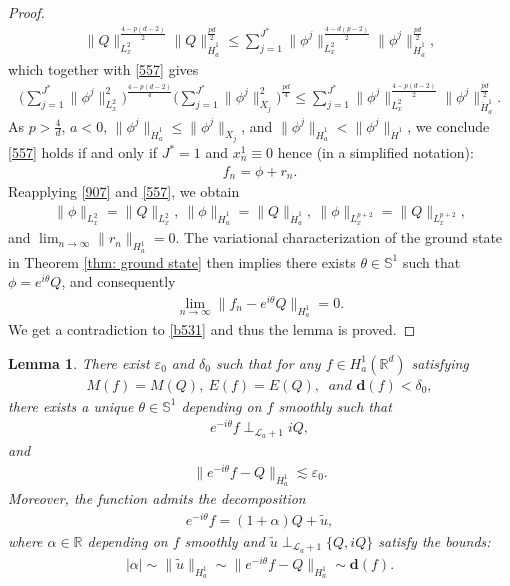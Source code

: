 \documentclass[12pt]{amsart}
\newcommand{\eps}{\varepsilon}
\newcommand{\la}{\mathcal L_a}
\newcommand{\nha}{H^1_a}
\newcommand{\ha}{\dot H^1_a}
\newtheorem{lemma}[theorem]{Lemma}
\begin{document}
\begin{proof}
\begin{align}\label{907}
\|Q\|_{L_x^2}^{\frac{4-p(d-2)}2}\|Q\|_{\ha}^{\frac{pd}2}\le \sum_{j=1}^{J^*}\|\phi^j\|_{L_x^2}^{\frac{4-d(p-2)}2}\|\phi^j\|_{\ha}^{\frac{pd}2},
\end{align}
which together with \eqref{557} gives
\begin{align}\label{1153}
\bigl(\sum_{j=1}^{J^*}\|\phi^j\|_{L_x^2}^2\bigr)^{\frac{4-p(d-2)}4}\bigl(\sum_{j=1}^{J^*}\|\phi^j\|_{X_j}^2\bigr)^{\frac{pd}4}
\le \sum_{j=1}^{J^*}\|\phi^j\|_{L_x^2}^{\frac{4-p(d-2)}2}\|\phi^j\|_{\ha}^{\frac{pd}2}. 
\end{align} 
As $p>\frac 4d$, $a<0$, $\|\phi^j\|_{\ha}\le \|\phi^j\|_{X_j}$, and $\|\phi^j\|_{\ha}<\|\phi^j\|_{\dot H^1}$, 
we conclude \eqref{557} holds if and only if $J^*=1$ and $x_n^1\equiv0$ hence (in a simplified notation):
 \begin{align*}
 f_n=\phi+r_n.
 \end{align*}
 Reapplying \eqref{907} and \eqref{557}, 
 we obtain 
 \begin{align*}
 \|\phi\|_{L_x^2}=\|Q\|_{L_x^2}, \ \|\phi\|_{\ha}=\|Q\|_{\ha}, \ \|\phi\|_{L_x^{p+2}}=\|Q\|_{L_x^{p+2}},
 \end{align*}
 and $\lim_{n\to \infty}\|r_n\|_{\nha}=0$. The variational characterization of the ground state in Theorem \ref{thm: ground state} then implies there exists $\theta\in \mathbb S^1$ such that $\phi=e^{i\theta}Q$, and consequently 
 \begin{align*}
 \lim_{n\to \infty}\|f_n-e^{i\theta}Q\|_{\nha}=0.
 \end{align*}
We get a contradiction to \eqref{b531} and thus the lemma is proved. 
\end{proof}





\begin{lemma}\label{lm: dec} There exist $\varepsilon_0$ and $\delta _{0}$ such that for any $f\in H_a^1(\mathbb R^d)$ satisfying
\begin{align}\label{condf}
M(f)=M(Q), \ E(f)=E(Q), \ \textit{ and } \mathbf{d}(f)<\delta_0, 
\end{align}
there exists a unique $\theta\in \mathbb S^1$ depending on $f$ smoothly such that  
\begin{align}\label{ortho}
e^{-i\theta}f\perp_{\la+1}iQ,
\end{align}
and 
\begin{align}\label{bound}
\|e^{-i\theta} f-Q\|_{\nha}\lesssim \eps_0. 
\end{align}
Moreover, the function admits the decomposition 
\begin{align}\label{decom}
e^{-i\theta}f=(1+\alpha)Q+\tilde u,
\end{align}
where $\alpha\in \mathbb R$ depending on $f$ smoothly and $\tilde u\perp_{\la+1}\{Q, iQ\}$ satisfy the bounds: 
\begin{align}\label{EQ0}
|\alpha|\sim \|\tilde u\|_{\nha}\sim \|e^{-i\theta}f-Q\|_{\nha}\sim \mathbf{d}(f).   
\end{align}
\end{lemma}
\end{document}
